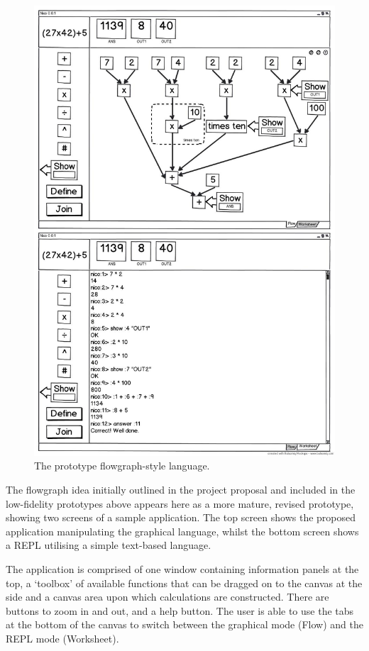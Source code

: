 \documentclass[12pt,twoside,notitlepage,xetex]{report}
\begin{document}
\begin{figure}[H]
\begin{center}
\includegraphics[width=\textwidth-4cm]{figs/mockups/flowgraph/img/fg-000.jpg}
\caption{The prototype flowgraph-style language.}
\label{fig:ProtoFlow}
\end{center}
\end{figure}

The flowgraph idea initially outlined in the project proposal and included in the low-fidelity prototypes above appears here as a more mature, revised prototype, showing two screens of a sample application.  The top screen shows the proposed application manipulating the graphical language, whilst the bottom screen shows a REPL utilising a simple text-based language.

The application is comprised of one window containing information panels at the top, a `toolbox' of available functions that can be dragged on to the canvas at the side and a canvas area upon which calculations are constructed.  There are buttons to zoom in and out, and a help button.  The user is able to use the tabs at the bottom of the canvas to switch between the graphical mode ({\sfapp Flow}) and the REPL mode ({\sfapp Worksheet}).
\end{document}
